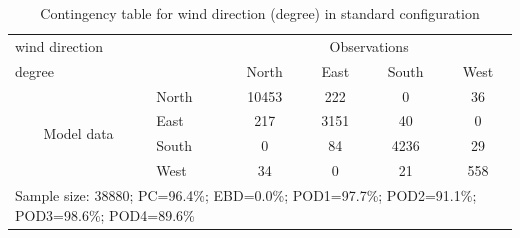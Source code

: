 \documentclass[a4paper,english]{article}
\begin{document}
\begin{table}[]
\begin{center}
\begin{tabular}{llcccc}
\hline
{wind direction}                                       &                                                    & \multicolumn{4}{c}{Observations}                 \\
{degree}                                       &                             & {North}   & {East} & {South} & {West} \\
\hline
\multicolumn{1}{c}{\multirow{4}{*}{Model data}}  & {North}              & 10453                & 222                       & 0              & 36\\
                                                 & {East}               & 217                & 3151                       & 40              & 0\\
                                                 & {South}              & 0                & 84                      & 4236             & 29\\
                                                 & {West}               & 34               & 0                      & 21             & 558\\
\hline 
\multicolumn{6}{l}{Sample size: 38880; PC=96.4\%; EBD=0.0\%; POD1=97.7\%; POD2=91.1\%; POD3=98.6\%; POD4=89.6\%}                 \\
\end{tabular}
\end{center}
\caption{Contingency table for {wind direction} (degree) in standard configuration}
\label{tab:contingencywdAFT}
\end{table}

\newpage
\end{document}
